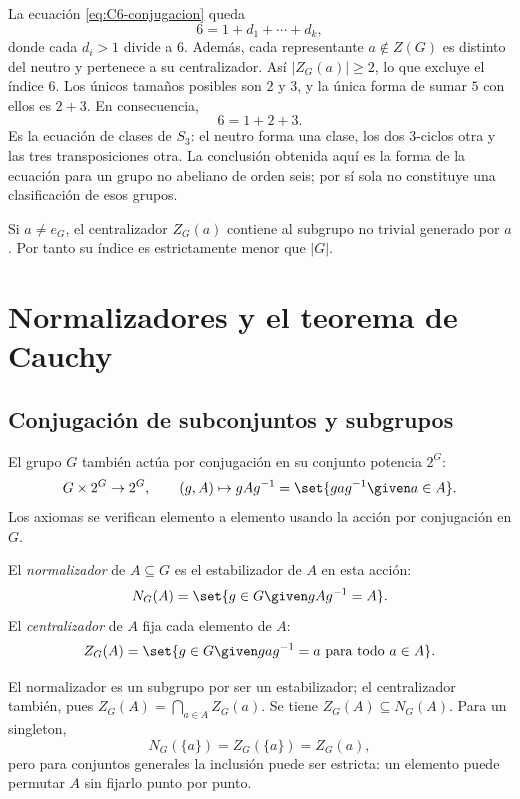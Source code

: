 La ecuación \eqref{eq:C6-conjugacion} queda
\[
6=1+d_1+\cdots+d_k,
\]
donde cada $d_i>1$ divide a $6$. Además, cada representante $a\notin Z(G)$ es distinto del neutro y pertenece a su centralizador. Así $|Z_G(a)|\ge2$, lo que excluye el índice $6$. Los únicos tamaños posibles son $2$ y $3$, y la única forma de sumar $5$ con ellos es $2+3$. En consecuencia,
\[
6=1+2+3.
\]
Es la ecuación de clases de $S_3$: el neutro forma una clase, los dos $3$-ciclos otra y las tres transposiciones otra. La conclusión obtenida aquí es la forma de la ecuación para un grupo no abeliano de orden seis; por sí sola no constituye una clasificación de esos grupos.
\begin{obs}
Si $a\ne e_G$, el centralizador $Z_G(a)$ contiene al subgrupo no trivial generado por $a$. Por tanto su índice es estrictamente menor que $|G|$.
\end{obs}

\section{Normalizadores y el teorema de Cauchy}
\subsection{Conjugación de subconjuntos y subgrupos}
El grupo $G$ también actúa por conjugación en su conjunto potencia $2^G$:
\[
G\times2^G\to2^G,\qquad(g,A)\mapsto gAg^{-1}
=\set{gag^{-1}\given a\in A}.
\]
Los axiomas se verifican elemento a elemento usando la acción por conjugación en $G$.

\begin{defi}
El \emph{normalizador} de $A\subseteq G$ es el estabilizador de $A$ en esta acción:
\[
N_G(A)=\set{g\in G\given gAg^{-1}=A}.
\]
El \emph{centralizador} de $A$ fija cada elemento de $A$:
\[
Z_G(A)=\set{g\in G\given gag^{-1}=a\text{ para todo }a\in A}.
\]
\end{defi}
El normalizador es un subgrupo por ser un estabilizador; el centralizador también, pues $Z_G(A)=\bigcap_{a\in A}Z_G(a)$. Se tiene $Z_G(A)\subseteq N_G(A)$. Para un singleton,
\[
N_G(\{a\})=Z_G(\{a\})=Z_G(a),
\]
pero para conjuntos generales la inclusión puede ser estricta: un elemento puede permutar $A$ sin fijarlo punto por punto.

